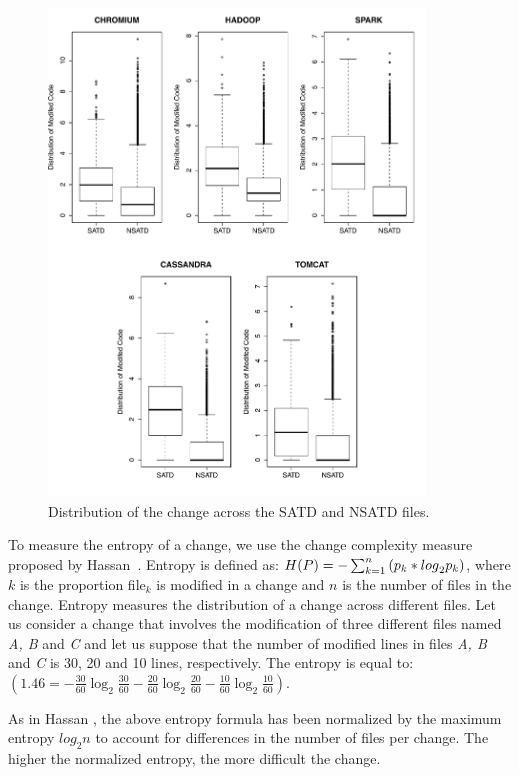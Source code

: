 \begin{figure}[!hp]
	\centering
	\includegraphics[width=100mm]{figures/chapter3/entropy_for_all_projects}
	\caption{Distribution of the change across the SATD and NSATD files.}
	\label{figure:mtdocatdf}
\end{figure}


To measure the entropy of a change, we use the change complexity measure proposed by Hassan~\cite{hassan2009predicting}. Entropy is defined as: $H(P)=-\sum _{k=1}^{n}\textrm ({p}_{k}*{log}_{2} {p}_{k})$, where $k$ is the proportion file$_{k}$ is modified in a change and $n$ is the number of files in the change. Entropy measures the distribution of a change across different files. Let us consider a change that involves the modification of three different files named \textit{A, B} and \textit{C} and let us suppose that the number of modified lines in files\textit{ A, B} and \textit{C} is 30, 20 and 10 lines, respectively. The entropy is equal to:
$(1.46=-\frac{30}{60}\log_{2}\frac{30}{60}-\frac{20}{60}\log_{2}\frac{20}{60}-\frac{10}{60}\log_{2}\frac{10}{60})$.

As in Hassan \cite{hassan2009predicting}, the above entropy formula has been normalized by the maximum entropy $log_{2}n$ to account for differences in the number of files per change. The higher the normalized entropy, the more difficult the change.





